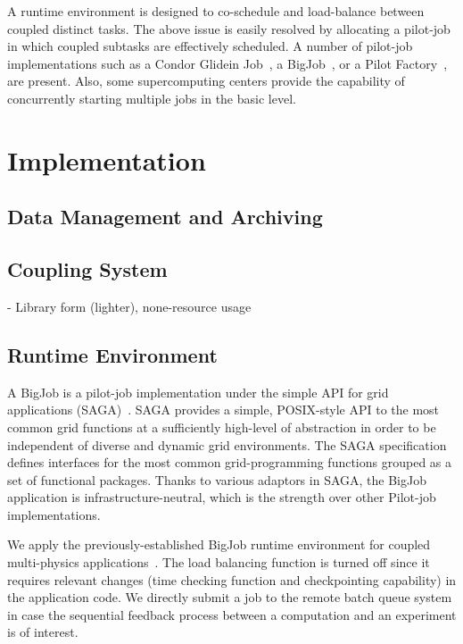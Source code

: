 \documentclass[10pt,conference]{IEEEtran}
\begin{document}
A runtime environment is designed to co-schedule and load-balance between
coupled distinct tasks. The above issue is easily resolved by allocating
a pilot-job in which coupled subtasks are effectively scheduled. A number of
pilot-job implementations such as a Condor Glidein Job~\cite{Condor},
a BigJob~\cite{saga_royalsoc}, or a Pilot Factory~\cite{PilotFactory},
are present. Also, some supercomputing centers provide the capability of
concurrently starting multiple jobs in the basic level.

\section{Implementation}
\label{sec:implementation}

\subsection{Data Management and Archiving}

\subsection{Coupling System}
- Library form (lighter), none-resource usage

\subsection{Runtime Environment}
A BigJob is a pilot-job implementation under the simple API for grid applications 
(SAGA)~\cite{saga_web}. SAGA provides a simple, POSIX-style API to the most common 
grid functions at a sufficiently high-level of abstraction in order to 
be independent of diverse and dynamic grid environments. The SAGA speciﬁcation 
defines interfaces for the most common grid-programming functions grouped as 
a set of functional packages. Thanks to various adaptors in SAGA, the BigJob
application is infrastructure-neutral, which is the strength over other
Pilot-job implementations.

We apply the previously-established BigJob runtime environment for coupled
multi-physics applications~\cite{CCGrid_Hybrid}. The load balancing function
is turned off since it requires relevant changes (time checking function and
checkpointing capability) in the application code.
We directly submit a job to the remote batch queue system in case the
sequential feedback process between a computation and an experiment is
of interest.
\end{document}
